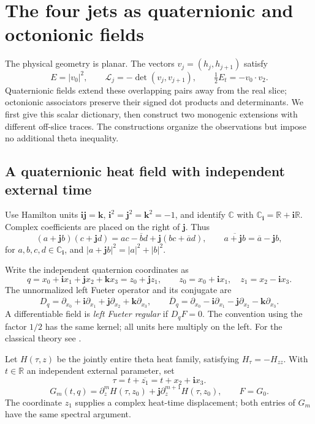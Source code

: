 \documentclass[11pt]{article}
\numberwithin{equation}{section}
\theoremstyle{definition}
\theoremstyle{remark}
\newcommand{\R}{\mathbb R}
\newcommand{\C}{\mathbb C}
\newcommand{\ii}{\mathbf i}
\newcommand{\jj}{\mathbf j}
\newcommand{\kk}{\mathbf k}
\newcommand{\Lag}{\mathcal L}
\begin{document}
\section{The four jets as quaternionic and octonionic fields}
\label{sec:hypercomplex}

The physical geometry is planar.  The vectors
\(v_j=(h_j,h_{j+1})\) satisfy
\[
 E=|v_0|^2,\qquad \Lag_j=-\det(v_j,v_{j+1}),\qquad
 \tfrac12E_t=-v_0\cdot v_2.
\]
Quaternionic fields extend these overlapping pairs away from the real
slice; octonionic associators preserve their signed dot products and
determinants.  We first give this scalar dictionary, then construct two
monogenic extensions with different off-slice traces.  The constructions
organize the observations but impose no additional theta inequality.

\subsection{A quaternionic heat field with independent external time}

Use Hamilton units \(\ii\jj=\kk\),
\(\ii^2=\jj^2=\kk^2=-1\), and identify
\(\C\) with \(\C_{\ii}=\R+\ii\R\).
Complex coefficients are placed on the right of \(\jj\). Thus
\begin{equation}
 (a+\jj b)(c+\jj d)
 =ac-\overline b d+\jj(bc+\overline a d),
 \qquad \overline{a+\jj b}=\overline a-\jj b,
 \label{eq:hc-quaternion-product}
\end{equation}
for \(a,b,c,d\in\C_{\ii}\), and
\(|a+\jj b|^2=|a|^2+|b|^2\).

Write the independent quaternion coordinates as
\[
 q=x_0+\ii x_1+\jj x_2+\kk x_3=z_0+\jj z_1,
 \qquad z_0=x_0+\ii x_1,\quad z_1=x_2-\ii x_3.
\]
The unnormalized left Fueter operator and its conjugate are
\[
 D_q=\partial_{x_0}+\ii\partial_{x_1}
                  +\jj\partial_{x_2}+\kk\partial_{x_3},
 \qquad
 \overline D_q=\partial_{x_0}-\ii\partial_{x_1}
                  -\jj\partial_{x_2}-\kk\partial_{x_3}.
\]
A differentiable field is \emph{left Fueter regular} if \(D_qF=0\).
The convention using the factor \(1/2\) has the same kernel; all units
here multiply on the left. For the classical theory see \cite{sudbery}.

Let \(H(\tau,z)\) be the jointly entire theta heat family, satisfying
\(H_\tau=-H_{zz}\). With \(t\in\R\) an independent external parameter,
set
\[
 \tau=t+\overline{z_1}=t+x_2+\ii x_3.
\]
\begin{equation}
 G_m(t,q)=\partial_z^mH(\tau,z_0)
                +\jj\partial_z^{m+1}H(\tau,z_0),
 \qquad F=G_0.
 \label{eq:hc-lift}
\end{equation}
The coordinate \(z_1\) supplies a complex heat-time displacement; both
entries of \(G_m\) have the same spectral argument.
\end{document}
